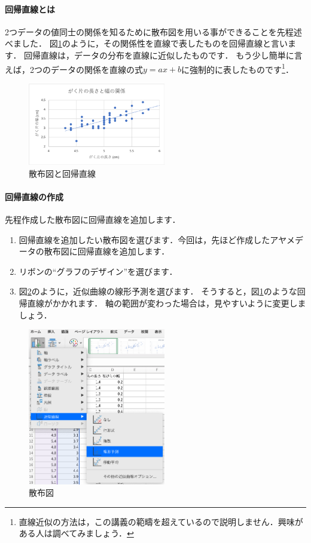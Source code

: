 \paragraph{回帰直線とは}

2つデータの値同士の関係を知るために散布図を用いる事ができることを先程述べました．
図\ref{fig:regression}のように，その関係性を直線で表したものを回帰直線と言います．
回帰直線は，データの分布を直線に近似したものです．
もう少し簡単に言えば，2つのデータの関係を直線の式$y=ax+b$に強制的に表したものです\footnote{直線近似の方法は，この講義の範疇を超えているので説明しません．興味がある人は調べてみましょう．}．

\begin{figure}[htbp]
    \centering
    \includegraphics[width=6cm]{chap2/regression.png}
    \caption{散布図と回帰直線}
    \label{fig:regression}
\end{figure}

\paragraph{回帰直線の作成}

先程作成した散布図に回帰直線を追加します．

\begin{enumerate}
    \item 回帰直線を追加したい散布図を選びます．今回は，先ほど作成したアヤメデータの散布図に回帰直線を追加します．
    \item リボンの``グラフのデザイン''を選びます．
    \item 図\ref{fig:regression_menu}のように，近似曲線の線形予測を選びます．
    そうすると，図\ref{fig:regression}のような回帰直線がかかれます．
    軸の範囲が変わった場合は，見やすいように変更しましょう．
\end{enumerate}

\begin{figure}[htbp]
    \centering
    \includegraphics[width=6cm]{chap2/regression_menu.png}
    \caption{散布図}
    \label{fig:regression_menu}
\end{figure}

